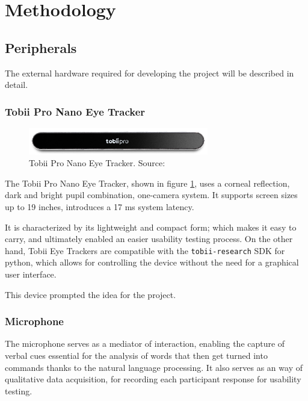 \section{Methodology}


\subsection{Peripherals}

The external hardware required for developing the project will be described in detail.

\subsubsection{Tobii Pro Nano Eye Tracker}

\begin{figure}[ht]
    \centering
    \includegraphics[width=0.7\textwidth]{images/tobii-pro-nano.png}
    \caption{Tobii Pro Nano Eye Tracker. Source: \citep{manual:tobiipronano}}
    \label{fig:tobii-eye-tracker}
\end{figure}

The Tobii Pro Nano Eye Tracker, shown in figure \ref{fig:tobii-eye-tracker}, uses a corneal reflection, dark and bright pupil combination, one-camera system. It supports screen sizes up to 19 inches, introduces a 17 ms system latency. \citep{manual:tobiipronano}

It is characterized by its lightweight and compact form; which makes it easy to carry, and ultimately enabled an easier usability testing process. On the other hand, Tobii Eye Trackers are compatible with the \verb|tobii-research| SDK for python, which allows for controlling the device without the need for a graphical user interface.

This device prompted the idea for the project.

\subsubsection{Microphone}

The microphone serves as a mediator of interaction, enabling the capture of verbal cues essential for the analysis of words that then get turned into commands thanks to the natural language processing. It also serves as an way of qualitative data acquisition, for recording each participant response for usability testing.


